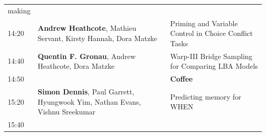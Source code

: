 \documentclass[]{article}
\begin{document}
\begin{longtable}[]{@{}lll@{}}
\begin{minipage}[t]{0.57\columnwidth}
making\strut
\end{minipage}\tabularnewline
\begin{minipage}[t]{0.03\columnwidth}\raggedright\strut
14:20\strut
\end{minipage} & \begin{minipage}[t]{0.32\columnwidth}\raggedright\strut
\textbf{Andrew Heathcote}, Mathieu Servant, Kirsty Hannah, Dora
Matzke\strut
\end{minipage} & \begin{minipage}[t]{0.57\columnwidth}\raggedright\strut
Priming and Variable Control in Choice Conflict Tasks\strut
\end{minipage}\tabularnewline
\begin{minipage}[t]{0.03\columnwidth}\raggedright\strut
14:40\strut
\end{minipage} & \begin{minipage}[t]{0.32\columnwidth}\raggedright\strut
\textbf{Quentin F. Gronau}, Andrew Heathcote, Dora Matzke\strut
\end{minipage} & \begin{minipage}[t]{0.57\columnwidth}\raggedright\strut
Warp-III Bridge Sampling for Comparing LBA Models\strut
\end{minipage}\tabularnewline
\begin{minipage}[t]{0.03\columnwidth}\raggedright\strut
14:50\strut
\end{minipage} & \begin{minipage}[t]{0.32\columnwidth}\raggedright\strut
\strut
\end{minipage} & \begin{minipage}[t]{0.57\columnwidth}\raggedright\strut
\textbf{Coffee}\strut
\end{minipage}\tabularnewline
\begin{minipage}[t]{0.03\columnwidth}\raggedright\strut
15:20\strut
\end{minipage} & \begin{minipage}[t]{0.32\columnwidth}\raggedright\strut
\textbf{Simon Dennis}, Paul Garrett, Hyungwook Yim, Nathan Evans, Vishnu
Sreekumar\strut
\end{minipage} & \begin{minipage}[t]{0.57\columnwidth}\raggedright\strut
Predicting memory for WHEN\strut
\end{minipage}\tabularnewline
\begin{minipage}[t]{0.03\columnwidth}\raggedright\strut
15:40\strut
\end{minipage} & \begin{minipage}[t]{0.32\columnwidth}\raggedright\strut

\end{minipage}
\end{longtable}
\end{document}
